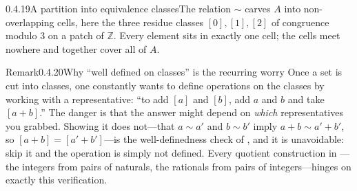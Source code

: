 \documentclass[main.tex]{subfiles}
\begin{document}
\begin{Fig}{0.4.19}{A partition into equivalence classes}{The relation $\sim$ carves $A$ into
non-overlapping cells, here the three residue classes $[0],[1],[2]$ of congruence modulo $3$ on a
patch of $\mathbb Z$. Every element sits in exactly one cell; the cells meet nowhere and together
cover all of $A$.}
\end{Fig}

\begin{ObjL}{Remark}{0.4.20}{Why ``well defined on classes'' is the recurring worry}
Once a set is cut into classes, one constantly wants to define operations on the classes by working
with a representative: ``to add $[a]$ and $[b]$, add $a$ and $b$ and take $[a+b]$.'' The danger is that
the answer might depend on \emph{which} representatives you grabbed. Showing it does not---that
$a\sim a'$ and $b\sim b'$ imply $a+b\sim a'+b'$, so $[a+b]=[a'+b']$---is the well-definedness check of
, and it is unavoidable: skip it and the operation is simply not defined. Every quotient
construction in ---the integers from pairs of naturals, the rationals from pairs of
integers---hinges on exactly this verification.
\end{ObjL}
\end{document}
